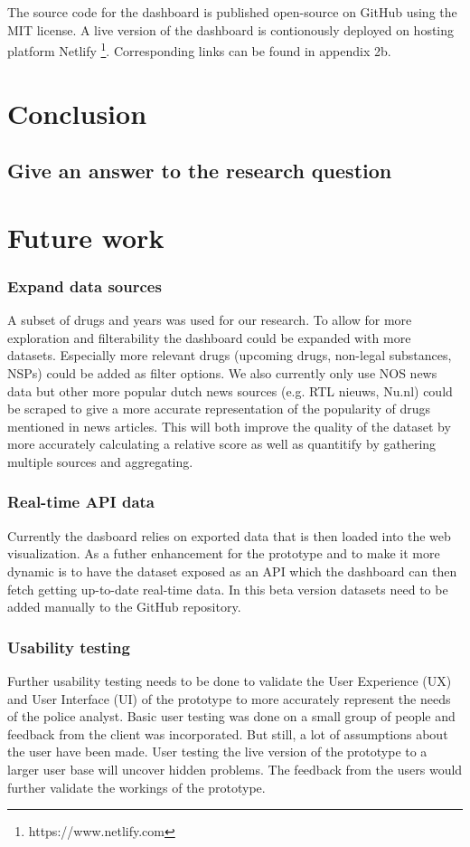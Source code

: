 The source code for the dashboard is published open-source on GitHub using the MIT license. A live version of the dashboard is contionously deployed on hosting platform Netlify \footnote{https://www.netlify.com}. Corresponding links can be found in appendix 2b.

\section{Conclusion}
\subsection{Give an answer to the research question}

\section{Future work}

\subsubsection{Expand data sources}
A subset of drugs and years was used for our research. To allow for more exploration and filterability the dashboard could be expanded with more datasets. Especially more relevant drugs (upcoming drugs, non-legal substances, NSPs) could be added as filter options. We also currently only use NOS news data but other more popular dutch news sources (e.g. RTL nieuws, Nu.nl) could be scraped to give a more accurate representation of the popularity of drugs mentioned in news articles. This will both improve the quality of the dataset by more accurately calculating a relative score as well as quantitify by gathering multiple sources and aggregating.

\subsubsection{Real-time API data}
Currently the dasboard relies on exported data that is then loaded into the web visualization. As a futher enhancement for the prototype and to make it more dynamic is to have the dataset exposed as an API which the dashboard can then fetch getting up-to-date real-time data. In this beta version datasets need to be added manually to the GitHub repository.

\subsubsection{Usability testing}
Further usability testing needs to be done to validate the User Experience (UX) and User Interface (UI) of the prototype to more accurately represent the needs of the police analyst. Basic user testing was done on a small group of people and feedback from the client was incorporated. But still, a lot of assumptions about the user have been made. User testing the live version of the prototype to a larger user base will uncover hidden problems. The feedback from the users would further validate the workings of the prototype.

